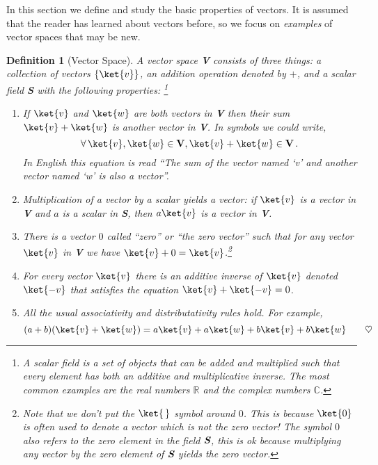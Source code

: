In this section we define and study the basic properties of vectors.
It is assumed that the reader has learned about vectors before, so we focus on \emph{examples} of vector spaces that may be new.


\newtheorem{definition}{Definition}
\begin{definition}[Vector Space]
A vector space \textbf{V} consists of three things: a collection of vectors $\{\ket{v}\}$, an addition operation denoted by $+$, and a scalar field \textit{\textbf{S}} with the following properties: \footnote{A scalar field is a set of objects that can be added and multiplied such that every element has both an additive and multiplicative inverse.
The most common examples are the real numbers $\mathbb{R}$ and the complex numbers $\mathbb{C}$.}
\begin{enumerate}
\item If $\ket{v}$ and $\ket{w}$ are both vectors in \textbf{V} then their sum $\ket{v} + \ket{w}$ is another vector in \textbf{V}.
In symbols we could write,
\begin{equation*}
\forall \, \ket{v}, \ket{w} \in \textbf{V}, \ket{v} + \ket{w} \in \textbf{V} \, .
\end{equation*}
In English this equation is read ``The sum of the vector named `v' and another vector named `w' is also a vector''.

\item Multiplication of a vector by a scalar yields a vector: if $\ket{v}$ is a vector in \textbf{V} and $a$ is a scalar in \textbf{S}, then $a\ket{v}$ is a vector in \textbf{V}.

\item There is a vector $0$ called ``zero'' or ``the zero vector'' such that for any vector $\ket{v}$ in \textbf{V} we have $\ket{v} + 0 = \ket{v}$.\footnote{Note that we don't put the $\ket{\,}$ symbol around $0$.
This is because $\ket{0}$ is often used to denote a vector which is \emph{not the zero vector!}
The symbol $0$ also refers to the zero element in the field $\textit{\textbf{S}}$, this is ok because multiplying any vector by the zero element of $\textit{\textbf{S}}$ yields the zero vector.}

\item For every vector $\ket{v}$ there is an additive inverse of $\ket{v}$ denoted $\ket{-v}$ that satisfies the equation $\ket{v} + \ket{-v} = 0$.

\item All the usual associativity and distributativity rules hold.
For example,
\begin{equation*}
(a+b)(\ket{v} + \ket{w}) = a\ket{v} + a\ket{w} + b\ket{v} + b\ket{w} \qquad \heartsuit
\end{equation*}
\end{enumerate}
\end{definition}

